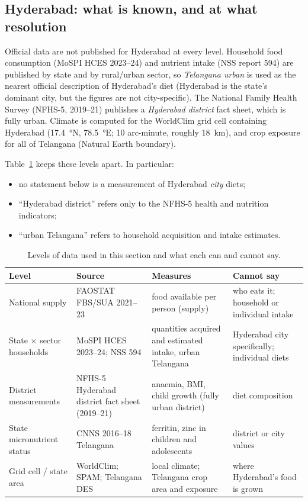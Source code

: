 \begin{table}[H]\centering\small
\caption{Share of India's national supply from the study crops, 2021--23 (numerator: summed crop contributions;
denominator: FBS national total).}\label{tab:indiashares}

\end{table}

\subsection{Hyderabad: what is known, and at what resolution}
Official data are not published for Hyderabad at every level. Household food consumption (MoSPI HCES 2023--24)
and nutrient intake (NSS report 594) are published by state and by rural/urban sector, so
\emph{Telangana urban} is used as the nearest official description of Hyderabad's diet (Hyderabad is the
state's dominant city, but the figures are not city-specific). The National Family Health Survey (NFHS-5,
2019--21) publishes a \emph{Hyderabad district} fact sheet, which is fully urban. Climate is computed for the
WorldClim grid cell containing Hyderabad (\SI{17.4}{\degree}N, \SI{78.5}{\degree}E; 10 arc-minute, roughly
\SI{18}{km}), and crop exposure for all of Telangana (Natural Earth boundary).

Table~\ref{tab:datalevels} keeps these levels apart. In particular:
\begin{itemize}
\item no statement below is a measurement of Hyderabad \emph{city} diets;
\item ``Hyderabad district'' refers only to the NFHS-5 health and nutrition indicators;
\item ``urban Telangana'' refers to household acquisition and intake estimates.
\end{itemize}

\begin{table}[H]\centering\small
\caption{Levels of data used in this section and what each can and cannot say.}\label{tab:datalevels}
\begin{tabular}{p{3.0cm}p{3.6cm}p{3.6cm}p{4.4cm}}
\toprule
Level & Source & Measures & Cannot say \\
\midrule
National supply & FAOSTAT FBS/SUA 2021--23 & food available per person (supply) & who eats it; household or individual intake \\
State $\times$ sector households & MoSPI HCES 2023--24; NSS 594 & quantities acquired and estimated intake, urban Telangana & Hyderabad city specifically; individual diets \\
District measurements & NFHS-5 Hyderabad district fact sheet (2019--21) & anaemia, BMI, child growth (fully urban district) & diet composition \\
State micronutrient status & CNNS 2016--18 Telangana & ferritin, zinc in children and adolescents & district or city values \\
Grid cell / state area & WorldClim; SPAM; Telangana DES & local climate; Telangana crop area and exposure & where Hyderabad's food is grown \\
\bottomrule
\end{tabular}
\end{table}


